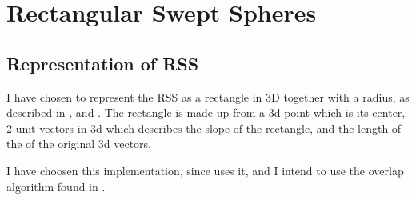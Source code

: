 
\section{Rectangular Swept Spheres}
\label{rss}


\subsection{Representation of RSS}
I have chosen to represent the RSS as a rectangle in 3D together with a radius, as described in \cite{larsen00fast}, \cite{Larsen99fastproximity} and \cite{237244}. The rectangle is made up from a 3d point which is its center, 2 unit vectors in 3d which describes the slope  of the rectangle, and the length of the of the original 3d vectors.

I have choosen this implementation, since \cite{327244} uses it, and I intend to use the overlap algorithm found in \cite{237244}.

